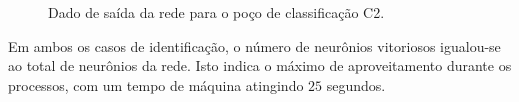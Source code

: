 \begin{figure}[H]
	\centering
	\setlength{\fboxsep}{8pt}
	\setlength{\fboxrule}{0.1pt}
	\caption{Dado de saída da rede para o poço de classificação C2.}
	\label{Class C2}
\end{figure} 


Em ambos os casos de identificação, o número de neurônios vitoriosos igualou-se ao total de neurônios da rede. Isto indica o máximo de aproveitamento durante os processos, com um tempo de máquina atingindo $25$ segundos.  

